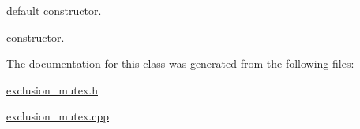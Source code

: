 default constructor. 

constructor. 

The documentation for this class was generated from the following files\-:\begin{DoxyCompactItemize}
\item 
\hyperlink{exclusion__mutex_8h}{exclusion\-\_\-mutex.\-h}\item 
\hyperlink{exclusion__mutex_8cpp}{exclusion\-\_\-mutex.\-cpp}\end{DoxyCompactItemize}
